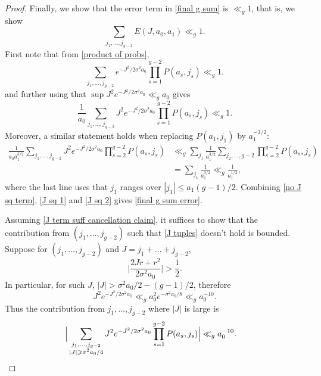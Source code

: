 \documentclass[hidelinks,11pt,reqno]{amsart}
\renewcommand{\leq}{\leqslant}
\renewcommand{\geq}{\geqslant}
\theoremstyle{remark}
\begin{document}
\begin{proof}
Finally, we show that the error term in \cref{final g sum} is $\ll_{g} 1$, that is, we show
\begin{equation}\label{final g sum error}
    \sum_{j_{1},\ldots, j_{g-2}}E(J,a_{0},a_{1})\ll_{g} 1.
\end{equation}
First note that from \cref{product of probs}, 
\begin{equation}\label{no J sq term}
    \sum_{j_{1},\ldots, j_{g-2}}e^{-J^{2}/2\sigma^{2}a_{0}}\prod_{s=1}^{g-2}P(a_{s},j_{s})\ll_{g} 1.
\end{equation}
and further using that $\sup J^{2}e^{-J^{2}/2\sigma^{2}a_{0}}\ll_{g} a_{0}$ gives
\begin{equation}\label{J sq 1}
    \frac{1}{a_{0}}\sum_{j_{1},\ldots, j_{g-2}}J^{2}e^{-J^{2}/2\sigma^{2}a_{0}}\prod_{s=1}^{g-2}P(a_{s},j_{s})\ll_{g} 1.
\end{equation}
    Moreover, a similar statement holds when replacing $P(a_{1},j_{1})$ by $a_{1}^{-3/2}$:
    \begin{align}
         \frac{1}{a_{0}a_{1}^{3/2}}\sum_{j_{1},\ldots, j_{g-2}}J^{2}e^{-J^{2}/2\sigma^{2}a_{0}}\prod_{s=2}^{g-2}P(a_{s},j_{s})&\ll_{g} \sum_{j_{1}}\frac{1}{a_{1}^{3/2}}\sum_{j_{2},\ldots, g-2}\prod_{s=2}^{g-2}P(a_{s},j_{s})\nonumber\\
         &=\sum_{j_{1}}\frac{1}{a_{1}^{3/2}}\ll_{g} \frac{1}{a_{1}^{1/2}},\label{J sq 2}
    \end{align}
    where the last line uses that $j_{1}$ ranges over $|j_{1}|\leq a_{1}(g-1)/2$.
    Combining \cref{no J sq term}, \cref{J sq 1} and \cref{J sq 2} gives \cref{final g sum error}.

Assuming \cref{J term suff cancellation claim}, it suffices to show that the contribution from $(j_{1},\ldots, j_{g-2})$ such that \cref{J tuples} doesn't hold is bounded. Suppose for $(j_{1},\ldots, j_{g-2})$ and $J=j_{1}+\ldots +j_{g-2}$,
\[\Big|\frac{2Jr+r^{2}}{2\sigma^{2}a_{0}}\Big |>\frac{1}{2}.\]
In particular, for such $J$, $|J|>\sigma^{2}a_{0}/2-(g-1)/2$, therefore
\begin{equation*}
    J^{2}e^{-J^{2}/2\sigma^{2}a_{0}}\ll_{g} a_{0}^{2}e^{-\sigma^{2}a_{0}/8}\ll_{g} a_{0}^{-10}.
\end{equation*}
Thus the contribution from $j_{1},\ldots, j_{g-2}$ where $|J|$ is large is
\begin{align*}
    \Big |\sum_{\substack{j_{1},\ldots, j_{g-2}\\ |J|\geq \sigma^{2}a_{0}/4}}J^{2}e^{-J^{2}/2\sigma^{2}a_{0}}\prod_{s=1}^{g-2}P(a_{s},j_{s})\Big |&\ll_{g} a_{0}^{-10}.\qedhere
\end{align*}
\end{proof}
\end{document}
